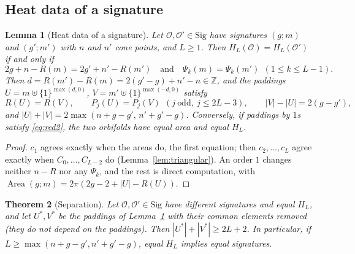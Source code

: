 \documentclass[pdflatex,sn-mathphys-num]{sn-jnl}
\theoremstyle{thmstyleone}%
\newtheorem{theorem}{Theorem}[section]%
\newtheorem{lemma}[theorem]{Lemma}%
\theoremstyle{thmstylethree}%
\newcommand{\Orb}{\mathcal{O}}
\newcommand{\Sig}{\mathrm{Sig}}
\newcommand{\Area}{\operatorname{Area}}
\newcommand{\Z}{\mathbb{Z}}
\begin{document}
\subsection{Heat data of a signature}

\begin{lemma}[Heat data of a signature]\label{lem:sigdata}
Let $\Orb,\Orb'\in\Sig$ have signatures $(g;m)$ and $(g';m')$ with $n$ and $n'$ cone points, and $L\ge1$. Then $H_L(\Orb)=H_L(\Orb')$ if and only if
\begin{equation}\label{eq:red1}
  2g+n-R(m)=2g'+n'-R(m')\quad\text{and}\quad\Psi_k(m)=\Psi_k(m')\ \ (1\le k\le L-1).
\end{equation}
Then $d=R(m')-R(m)=2(g'-g)+n'-n\in\Z$, and the paddings $U=m\uplus\{1\}^{\max(d,0)}$, $V=m'\uplus\{1\}^{\max(-d,0)}$ satisfy
\begin{equation}\label{eq:red2}
  R(U)=R(V),\qquad P_j(U)=P_j(V)\ \ (j\ \text{odd},\ j\le2L-3),\qquad |V|-|U|=2(g-g'),
\end{equation}
and $|U|+|V|=2\max(n+g-g',\,n'+g'-g)$. Conversely, if paddings by $1$s satisfy \eqref{eq:red2}, the two orbifolds have equal area and equal $H_L$.
\end{lemma}

\begin{proof}
$c_1$ agrees exactly when the areas do, the first equation; then $c_2,\dots,c_L$ agree exactly when $C_0,\dots,C_{L-2}$ do (Lemma~\ref{lem:triangular}). An order $1$ changes neither $n-R$ nor any $\Psi_k$, and the rest is direct computation, with $\Area(g;m)=2\pi(2g-2+|U|-R(U))$.
\end{proof}

\begin{theorem}[Separation]\label{thm:sigsep}
Let $\Orb,\Orb'\in\Sig$ have different signatures and equal $H_L$, and let $U^*,V^*$ be the paddings of Lemma~\ref{lem:sigdata} with their common elements removed (they do not depend on the paddings). Then $|U^*|+|V^*|\ge2L+2$. In particular, if $L\ge\max(n+g-g',n'+g'-g)$, equal $H_L$ implies equal signatures.
\end{theorem}
\end{document}
